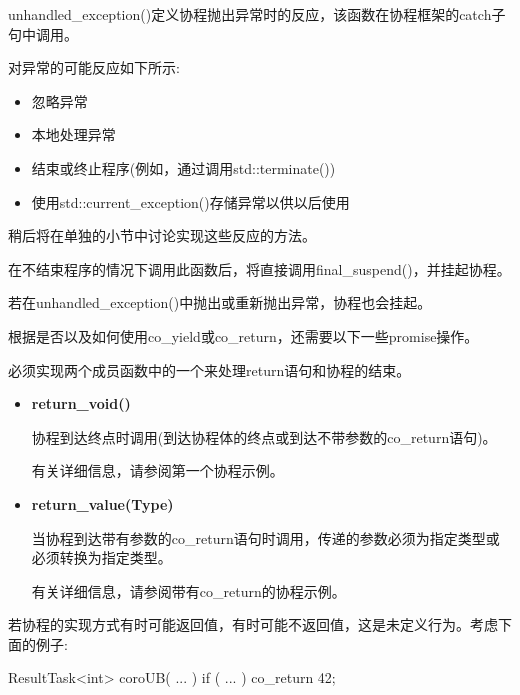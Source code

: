 
unhandled\_exception()定义协程抛出异常时的反应，该函数在协程框架的catch子句中调用。

对异常的可能反应如下所示:

\begin{itemize}
\item
忽略异常

\item
本地处理异常

\item
结束或终止程序(例如，通过调用std::terminate())

\item
使用std::current\_exception()存储异常以供以后使用
\end{itemize}

稍后将在单独的小节中讨论实现这些反应的方法。

在不结束程序的情况下调用此函数后，将直接调用final\_suspend()，并挂起协程。

若在unhandled\_exception()中抛出或重新抛出异常，协程也会挂起。


根据是否以及如何使用co\_yield或co\_return，还需要以下一些promise操作。


必须实现两个成员函数中的一个来处理return语句和协程的结束。

\begin{itemize}
\item
\textbf{return\_void()}

协程到达终点时调用(到达协程体的终点或到达不带参数的co\_return语句)。

有关详细信息，请参阅第一个协程示例。

\item
\textbf{return\_value(Type)}

当协程到达带有参数的co\_return语句时调用，传递的参数必须为指定类型或必须转换为指定类型。

有关详细信息，请参阅带有co\_return的协程示例。
\end{itemize}

若协程的实现方式有时可能返回值，有时可能不返回值，这是未定义行为。考虑下面的例子:

\begin{cpp}
ResultTask<int> coroUB( ... )
{
	if ( ... ) {
		co_return 42;
	}
}
\end{cpp}

